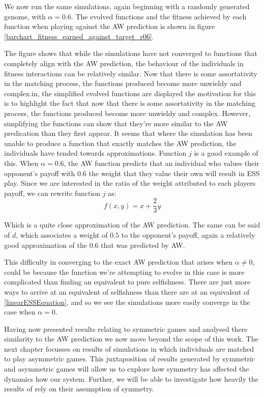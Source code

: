 \documentclass[11pt]{book}
\newcommand*{\np}{\par\noindent\newline}
\begin{document}
\np We now run the same simulations, again beginning with a randomly generated genome, with $\alpha = 0.6$.
The evolved functions and the fitness achieved by each function when playing against the AW prediction is shown in figure \ref{barchart_fitness_earned_against_target_r06}.
\np The figure shows that while the simulations have not converged to functions that completely align with the AW prediction,
the behaviour of the individuals in fitness interactions can be relatively similar.
Now that there is some assortativity in the matching process, the functions produced become more unwieldy and complex.in, the simplified evolved functions are displayed the motivation for this is to highlight the fact that now that there is some assortativity in the matching process, the functions produced become more unwieldy and complex.
However, simplifying the functions can show that they're more similar to the AW predication than they first appear.
It seems that where the simulation has been unable to produce a function that exactly matches the AW prediction, the individuals have tended towards approximations.
Function $j$ is a good example of this.
When $\alpha = 0.6$, the AW function predicts that an individual who values their opponent's payoff with 0.6 the weight that they value their own will result in ESS play.
Since we are interested in the ratio of the weight attributed to each players payoff, we can rewrite function $j$ as:
\begin{equation*}
	f(x, y) = x + \frac{2}{3} y
\end{equation*}


\noindent Which is a quite close approximation of the AW prediction.
The same can be said of $d$, which associates a weight of $0.5$ to the opponent's payoff, again a relatively good approximation of the $0.6$ that was predicted by AW.

\np This difficulty in converging to the exact AW prediction that arises when $\alpha \neq 0$, could be because the function we're attempting to evolve in this case is more complicated than finding an equivalent to pure selfishness.
There are just more ways to arrive at an equivalent of selfishness than there are at an equivalent of \ref{linearESSEquation}, and so we see the simulations more easily converge in the case when $\alpha = 0$.


\np Having now presented results relating to symmetric games and analysed there similarity to the AW prediction we now move beyond the scope of this work.
The next chapter focusses on results of simulations in which individuals are matched to play asymmetric games.
This juxtaposition of results generated by symmetric and asymmetric games will allow us to explore how symmetry has affected the dynamics how our system.
Further, we will be able to investigate how heavily the results of \citeauthor{alger_generalization_2012} rely on their assumption of symmetry.
\end{document}
